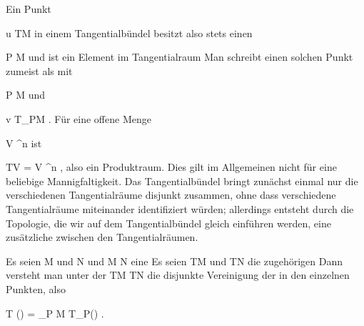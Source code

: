 Ein Punkt

\mavergleichskette
{\vergleichskette
{ u
}
{ \in }{ TM
}
{  }{
}
{    }{
}
{   }{
}
}
{}{}{}
in einem Tangentialbündel besitzt also stets einen  {}

\mavergleichskette
{\vergleichskette
{ P
}
{ \in }{ M
}
{  }{
}
{    }{
}
{   }{
}
}
{}{}{}
und ist ein Element im Tangentialraum
 Man schreibt einen solchen Punkt zumeist als
 mit

\mavergleichskette
{\vergleichskette
{ P
}
{ \in }{ M
}
{  }{
}
{    }{
}
{   }{
}
}
{}{}{}
und

\mavergleichskette
{\vergleichskette
{ v
}
{ \in }{ T_PM
}
{  }{
}
{    }{
}
{   }{
}
}
{}{}{.}
Für eine offene Menge

\mavergleichskette
{\vergleichskette
{ V
}
{ \subseteq }{ \R^n
}
{  }{
}
{    }{
}
{   }{
}
}
{}{}{}
ist

\mavergleichskette
{\vergleichskette
{ TV
}
{ = }{ V \times \R^n
}
{  }{
}
{    }{
}
{   }{
}
}
{}{}{,}
also ein Produktraum. Dies gilt im Allgemeinen nicht für eine beliebige Mannigfaltigkeit. Das Tangentialbündel bringt zunächst einmal nur die verschiedenen Tangentialräume disjunkt zusammen, ohne dass verschiedene Tangentialräume miteinander identifiziert würden; allerdings entsteht durch die Topologie, die wir auf dem Tangentialbündel gleich einführen werden, eine zusätzliche  zwischen den Tangentialräumen.

{}
{

Es seien
\mathkor {} {M} {und} {N} {}
und
\maabbdisp {\varphi} { M } { N
} {}
eine
Es seien
\mathkor {} {TM} {und} {TN} {}
die zugehörigen
Dann versteht man unter der 
 {TM} {TN
} {}
die disjunkte Vereinigung der
in den einzelnen Punkten, also

\mavergleichskettedisp
{\vergleichskette
{ T (\varphi)
}
{ =} { \biguplus_{P \in M} T_P(\varphi)
}
{ } {
}
{ } {
}
{ } {
}
}
{}{}{.}

}

